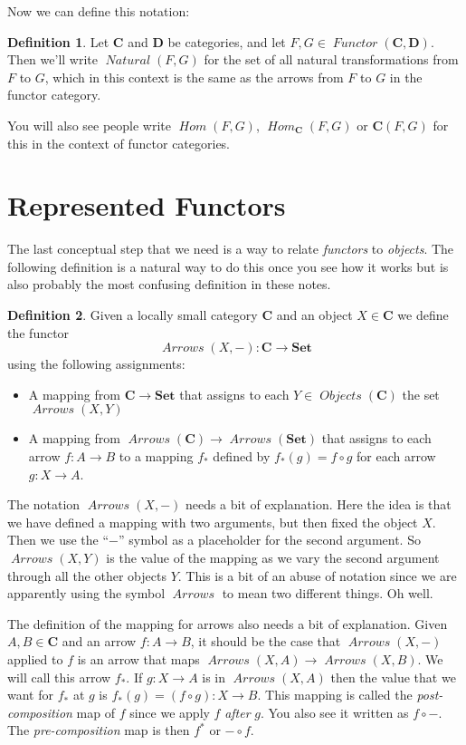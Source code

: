 \documentclass[12pt]{article}
\theoremstyle{definition}
\theoremstyle{definition}
\newtheorem{defn}{Definition}[]
\theoremstyle{definition}
\numberwithin{equation}{section}
\newcommand{\cat}[1]{\mathbf{#1}}      %
\newcommand{\fcat}[1]{{\mathbf {#1}}}    %
\newcommand{\CC}{\cat{C}}
\newcommand{\DD}{\cat{D}}
\DeclareMathOperator{\Arrows}{\mathit{Arrows}}
\DeclareMathOperator{\Objects}{\mathit{Objects}}
\DeclareMathOperator{\Hom}{\mathit{Hom}}
\DeclareMathOperator{\Nat}{\mathit{Natural}}
\DeclareMathOperator{\Fun}{\mathit{Functor}}
\newcommand{\Set}{\fcat{Set}}           %
\def\ni{\goodbreak\noindent}
\begin{document}
Now we can define this notation:

\begin{defn}
Let $\CC$ and $\DD$ be categories, and let $F, G \in \Fun(\CC, \DD)$. Then
we'll write $\Nat(F, G)$ for the set of all natural transformations from $F$ to $G$, which
in this context is the same as the arrows from $F$ to $G$ in the functor category.
\end{defn}
\ni
You will also see people write $\Hom(F, G)$, $\Hom_{\CC}(F,G)$ or $\CC(F, G)$ for this in the context
of functor categories.

\section{Represented Functors}

The last conceptual step that we need is a way to relate {\it functors} to {\it
objects}. The following definition is a natural way to do this once you see how it works
but is also probably the most confusing definition in these notes.

\begin{defn}
Given a locally small category $\CC$ and an object $X \in \CC$ we define the functor
$$
\Arrows(X,-) : \CC \to \Set
$$
using the following assignments:
\begin{itemize}
\item A mapping from $\CC \to \Set$ that assigns to each $Y \in \Objects(\CC)$ the set
$\Arrows(X,Y)$
\item A mapping from $\Arrows(\CC) \to \Arrows(\Set) $ that assigns to each arrow $f: A
\to B$ to a mapping $f_*$ defined by $f_*(g) = f\circ g$ for each arrow $g: X \to A$.
\end{itemize}
\end{defn}

The notation $\Arrows(X,-)$ needs a bit of explanation. Here the idea is that we have defined
a mapping with two arguments, but then fixed the object $X$. 
Then we use the ``$-$'' symbol as a 
placeholder for the second argument. So $\Arrows(X,Y)$ is
the value of the mapping as we vary the second argument through all the other objects $Y$. 
This is a bit of an abuse of notation since we 
are apparently using the symbol $\Arrows$ to mean two different things. Oh well.

The definition of the mapping for arrows also needs a bit of explanation.
Given $A,B \in \CC$ and an arrow $f: A \to B$, it should be the case that $\Arrows(X,-)$ 
applied to $f$ is an arrow that maps $\Arrows(X,A) \to \Arrows(X,B)$.
We will call this arrow $f_*$.  
If $g: X \to A$ is in $\Arrows(X,A)$
then the value 
that we want for $f_*$ at $g$ is $f_*(g) = (f \circ g): X \to B$.
This mapping is called the {\it post-composition} map of $f$ since
we apply $f$ {\it after} $g$.
You also see it written as $f \circ -$.
The {\it pre-composition} map is then $f^*$ or $- \circ f$.
\end{document}
